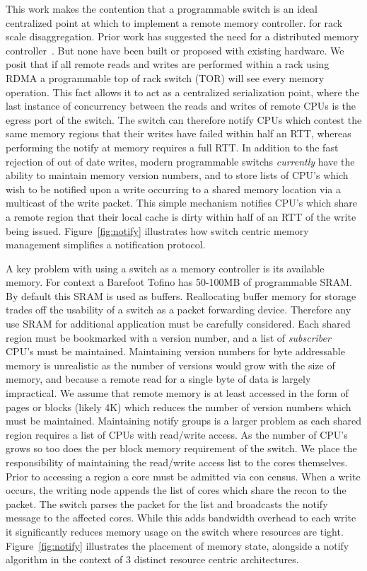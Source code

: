This work makes the contention that a programmable switch is an ideal
centralized point at which to implement a remote memory controller.
for rack scale disaggregation.  Prior work has suggested the need for
a distributed memory controller~\cite{254120}. But none have been
built or proposed with existing hardware. We posit that if all remote
reads and writes are performed within a rack using RDMA a programmable
top of rack switch (TOR) will see every memory operation. This fact
allows it to act as a centralized serialization point, where the last
instance of concurrency between the reads and writes of remote CPUs is
the egress port of the switch. The switch can therefore notify CPUs
which contest the same memory regions that their writes have failed
within half an RTT, whereas performing the notify at memory requires a
full RTT. In addition to the fast rejection of out of date writes,
modern programmable switchs \textit{currently} have the ability to
maintain memory version numbers, and to store lists of CPU's which
wish to be notified upon a write occurring to a shared memory location
via a multicast of the write packet. This simple mechanism notifies
CPU's which share a remote region that their local cache is dirty
within half of an RTT of the write being issued.
Figure~\ref{fig:notify} illustrates how switch centric memory
management simplifies a notification protocol. 

A key problem with using a switch as a memory controller is its
available memory. For context a Barefoot Tofino has 50-100MB of
programmable SRAM. By default this SRAM is used as buffers.
Reallocating buffer memory for storage trades off the usability of a
switch as a packet forwarding device. Therefore any use SRAM for
additional application must be carefully considered. Each shared
region must be bookmarked with a version number, and a list of
\textit{subscriber} CPU's must be maintained.  Maintaining version
numbers for byte addressable memory is unrealistic as the number of
versions would grow with the size of memory, and because a remote read
for a single byte of data is largely impractical. We assume that
remote memory is at least accessed in the form of pages or blocks
(likely 4K) which reduces the number of version numbers which must be
maintained.  Maintaining notify groups is a larger problem as each
shared region requires a list of CPUs with read/write access. As the
number of CPU's grows so too does the per block memory requirement of
the switch.  We place the responsibility of maintaining the read/write
access list to the cores themselves.  Prior to accessing a region a
core must be admitted via con census.  When a write occurs, the
writing node appends the list of cores which share the recon to the
packet. The switch parses the packet for the list and broadcasts the
notify message to the affected cores. While this adds bandwidth
overhead to each write it significantly reduces memory usage on the
switch where resources are tight. Figure~\ref{fig:notify} illustrates
the placement of memory state, alongside a notify algorithm in the
context of 3 distinct resource centric architectures.

